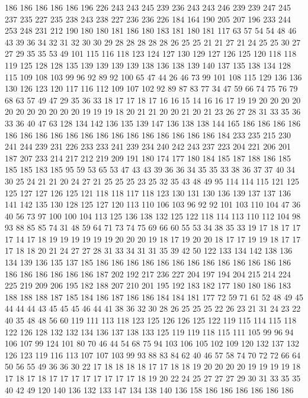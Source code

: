 186 186 186 186 186 196 226 243 243 245 239 236 243 243 246 239 239 247 245 237
235 227 235 238 243 238 227 236 236 226 184 164 190 205 207 196 233 244 253 248
231 212 190 180 180 181 186 180 183 181 180 181 117 63 57 54 54 48 46 43
39 36 34 32 31 32 30 30 29 28 28 28 28 28 26 25 25 21 21 27
21 24 25 25 30 27 27 29 35 35 53 49 101 115 116 118 123 124 127 130
129 127 126 125 120 118 118 119 125 128 128 135 139 139 139 139 138 136 138 139
140 137 135 138 134 128 115 109 108 103 99 96 92 89 92 100 65 47 44 26
46 73 99 101 108 115 129 136 136 130 126 123 120 117 116 112 109 107 102 92
89 87 83 77 34 47 59 66 74 75 76 79 68 63 57 49 47 29 35 36
33 18 17 17 18 17 16 16 15 14 16 16 17 19 19 20 20 20 20 20
20 20 20 20 20 20 19 19 19 18 20 21 21 20 20 21 20 21 23 26
27 28 31 33 35 36 33 36 40 47 63 128 134 142 136 135 139 147 136 138
138 144 165 186 186 186 186 186 186 186 186 186 186 186 186 186 186 186 186 186
186 184 233 235 215 230 241 244 239 231 226 233 233 241 239 234 240 242 243 237
223 204 221 206 201 187 207 233 214 217 212 219 209 191 180 174 177 180 184 185
187 188 186 185 185 185 183 185 95 59 53 65 53 47 43 43 39 36 36 34
35 35 33 38 36 37 37 40 34 30 25 24 21 21 20 24 27 21 25 25
25 23 25 32 35 43 48 49 95 114 114 115 121 125 125 127 127 126 125 121
118 118 117 118 123 130 131 130 136 139 137 137 136 141 142 135 130 128 125 127
120 113 110 106 103 96 92 92 101 103 110 104 47 36 40 56 73 97 100 100
104 113 125 136 138 132 125 122 118 114 113 110 112 104 98 93 88 85 85 74
31 48 59 64 71 73 74 75 69 66 60 55 53 34 38 35 33 19 17 18
17 17 17 14 17 18 19 19 19 19 19 19 20 20 20 19 18 17 19 20
20 18 17 17 19 19 18 17 17 17 18 18 20 21 24 27 27 28 31 33
34 31 31 35 39 42 50 122 133 134 142 138 136 134 139 136 135 137 185 186
186 186 186 186 186 186 186 186 186 186 186 186 186 186 186 186 186 186 187 202
192 217 236 227 204 197 194 204 215 214 224 225 219 209 206 195 182 188 207 210
201 195 192 183 182 177 180 180 186 183 188 188 188 187 185 184 186 187 186 186
184 184 181 177 72 59 71 61 52 48 49 45 44 44 44 43 45 45 45 46
44 41 38 36 32 30 28 26 25 25 25 22 26 23 21 31 24 23 22 40
35 48 48 56 60 119 111 113 118 123 125 126 126 125 122 119 115 114 115 118
122 126 128 132 132 134 136 137 138 133 125 119 119 118 115 111 105 99 96 94
106 107 99 124 101 80 70 46 44 54 68 75 94 103 106 105 102 109 120 132
137 132 126 123 119 116 113 107 107 103 99 93 88 83 84 62 40 46 57 58
74 70 72 72 66 64 50 56 55 49 36 36 30 22 17 18 18 18 18 17
17 18 18 19 20 20 20 20 19 19 19 19 18 17 18 17 18 17 17 17
17 17 17 17 17 18 19 20 22 24 25 27 27 27 29 30 31 33 35 35
40 42 49 120 140 136 132 133 147 134 138 140 136 158 186 186 186 186 186 186
